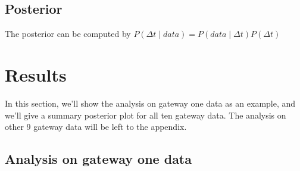 \documentclass[\docopts]{\docclass}
\begin{document}
\subsection{Posterior}
The posterior can be computed by
$P(\Delta t \mid data) = P(data \mid \Delta t) P(\Delta t)$

\section{Results}
\label{sec:results}
In this section, we'll show the analysis on gateway one data as an example, and we'll give a summary posterior plot for all ten gateway data. The analysis on other 9 gateway data  will be left to the appendix.

\subsection{Analysis on gateway one data}
\end{document}

